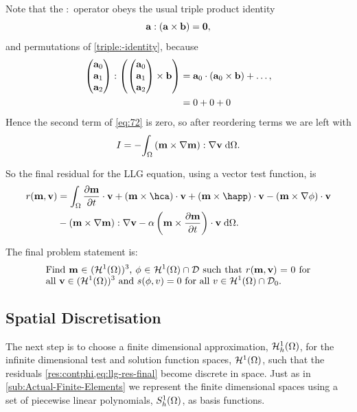 Note that the $:$ operator obeys the usual triple product identity
\begin{equation}
  {\mathbf{a}} : ({\mathbf{a}} \times {\mathbf{b}}) = \mathbf{0},
  \label{triple:-identity}
\end{equation}
and permutations of \cref{triple:-identity}, because
\begin{equation}
  \begin{aligned} 
    \begin{pmatrix} {\mathbf{a}}_0 \\ {\mathbf{a}}_1 \\ {\mathbf{a}}_2 \end{pmatrix} : {\left( \begin{pmatrix} {\mathbf{a}}_0 \\ {\mathbf{a}}_1 \\ {\mathbf{a}}_2 \end{pmatrix} \times {\mathbf{b}} \right)} &= {\mathbf{a}}_0 \cdot ({\mathbf{a}}_0 \times {\mathbf{b}}) + \ldots, \\
    & = 0 + 0 + 0
  \end{aligned}
\end{equation}
Hence the second term of \cref{eq:72} is zero, so after reordering terms we are left with
\begin{equation}
  \label{eq:final-lap-residual}
  I = - {\int_{\Omega} {{\left( \mathbf{m} \times \nabla \mathbf{m} \right)} : \nabla \mathbf{v}} {\; \mathrm{{d}}} {\Omega}}.
\end{equation}

So the final residual for the LLG equation, using a vector test function, is
\begin{equation}
  \begin{aligned}
    \label{eq:llg-res-final}
    \rllg(\mv, \testv) &= \int_\magd \dmdt\cdot \testv
    + (\mv \times \hca)\cdot \testv 
    + (\mv \times \happ)\cdot \testv 
    - (\mv \times \nabla \phi)\cdot \testv \\
    & - \bigb{\mv \times \grad \mv} : \grad \testv
    - \dampc \left( \mv \times \dmdt \right)\cdot \testv
    \d\magd.
  \end{aligned}
\end{equation}

The final problem statement is: 
\begin{equation}
  \eqpar{Find $\mv \in (\tsinf)^3$, $\phim \in \tsinf \cap \Dfs$ such that $\rllg(\mv, \testv) = 0$ for all $\testv \in (\tsinf)^3$ and $\rphi(\phim, \test) = 0$ for all $\test \in \tsinf \cap \Dfs_0$.}
\label{eq:inf-dim-problem}
\end{equation}




\subsection{Spatial Discretisation}
\label{sec:spat-discr-resi}

The next step is to choose a finite dimensional approximation, ${\mathcal{H}^1_h(\Omega)}$, for the infinite dimensional test and solution function spaces, ${\mathcal{H}^1(\Omega)}$, such that the residuals \cref{res:contphi,eq:llg-res-final} become discrete in space.
Just as in \cref{sub:Actual-Finite-Elements} we represent the finite dimensional spaces using a set of piecewise linear polynomials, ${S_h^1(\Omega)}$, as basis functions.

